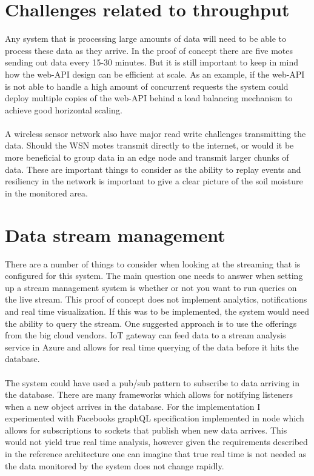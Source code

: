\documentclass[]{uiophd}
\begin{document}
\section{Challenges related to throughput}

Any system that is processing large amounts of data will need to be able to process these data as they arrive. In the proof of concept there are five motes sending out data every 15-30 minutes. But it is still important to keep in mind how the web-API design can be efficient at scale. As an example, if the web-API is not able to handle a high amount of concurrent requests the system could deploy multiple copies of the web-API behind a load balancing mechanism to achieve good horizontal scaling.
\\\\
A wireless sensor network also have major read write challenges transmitting the data. Should the WSN motes transmit directly to the internet, or would it be more beneficial to group data in an edge node and transmit larger chunks of data. These are important things to consider as the ability to replay events and resiliency in the network is important to give a clear picture of the soil moisture in the monitored area.

\section{Data stream management}
There are a number of things to consider when looking at the streaming that is configured for this system. The main question one needs to answer when setting up a stream management system is whether or not you want to run queries on the live stream. This proof of concept does not implement analytics, notifications and real time visualization. If this was to be implemented, the system would need the ability to query the stream. One suggested approach is to use the offerings from the big cloud vendors. IoT gateway can feed data to a stream analysis service in Azure and allows for real time querying of the data before it hits the database.
\\\\
The system could have used a pub/sub pattern to subscribe to data arriving in the database. There are many frameworks which allows for notifying listeners when a new object arrives in the database. For the implementation I experimented with Facebooks graphQL specification implemented in node which allows for subscriptions to sockets that publish when new data arrives. This would not yield true real time analysis, however given the requirements described in the reference architecture one can imagine that true real time is not needed as the data monitored by the system does not change rapidly.
\end{document}
